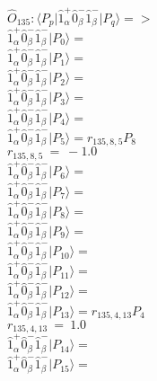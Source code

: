 \documentclass[14pt]{article}
\begin{document}
    $\hat{O}_{135}:  \langle{P_p}\vert \hat{1}_{\alpha}^{+}\hat{0}_{\beta}^{-}\hat{1}_{\beta}^{-} \vert{P_q}\rangle => $ \\ 
    $ \hat{1}_{\alpha}^{+}\hat{0}_{\beta}^{-}\hat{1}_{\beta}^{-} \vert{P_{0}}\rangle =  $ \\ 
    $ \hat{1}_{\alpha}^{+}\hat{0}_{\beta}^{-}\hat{1}_{\beta}^{-} \vert{P_{1}}\rangle =  $ \\ 
    $ \hat{1}_{\alpha}^{+}\hat{0}_{\beta}^{-}\hat{1}_{\beta}^{-} \vert{P_{2}}\rangle =  $ \\ 
    $ \hat{1}_{\alpha}^{+}\hat{0}_{\beta}^{-}\hat{1}_{\beta}^{-} \vert{P_{3}}\rangle =  $ \\ 
    $ \hat{1}_{\alpha}^{+}\hat{0}_{\beta}^{-}\hat{1}_{\beta}^{-} \vert{P_{4}}\rangle =  $ \\ 
    $ \hat{1}_{\alpha}^{+}\hat{0}_{\beta}^{-}\hat{1}_{\beta}^{-} \vert{P_{5}}\rangle = {r}_{135,8,5}P_{8} $ \\ 
    ${r}_{135,8,5}\ =\ -1.0 $ \\ 
    $ \hat{1}_{\alpha}^{+}\hat{0}_{\beta}^{-}\hat{1}_{\beta}^{-} \vert{P_{6}}\rangle =  $ \\ 
    $ \hat{1}_{\alpha}^{+}\hat{0}_{\beta}^{-}\hat{1}_{\beta}^{-} \vert{P_{7}}\rangle =  $ \\ 
    $ \hat{1}_{\alpha}^{+}\hat{0}_{\beta}^{-}\hat{1}_{\beta}^{-} \vert{P_{8}}\rangle =  $ \\ 
    $ \hat{1}_{\alpha}^{+}\hat{0}_{\beta}^{-}\hat{1}_{\beta}^{-} \vert{P_{9}}\rangle =  $ \\ 
    $ \hat{1}_{\alpha}^{+}\hat{0}_{\beta}^{-}\hat{1}_{\beta}^{-} \vert{P_{10}}\rangle =  $ \\ 
    $ \hat{1}_{\alpha}^{+}\hat{0}_{\beta}^{-}\hat{1}_{\beta}^{-} \vert{P_{11}}\rangle =  $ \\ 
    $ \hat{1}_{\alpha}^{+}\hat{0}_{\beta}^{-}\hat{1}_{\beta}^{-} \vert{P_{12}}\rangle =  $ \\ 
    $ \hat{1}_{\alpha}^{+}\hat{0}_{\beta}^{-}\hat{1}_{\beta}^{-} \vert{P_{13}}\rangle = {r}_{135,4,13}P_{4} $ \\ 
    ${r}_{135,4,13}\ =\ 1.0 $ \\ 
    $ \hat{1}_{\alpha}^{+}\hat{0}_{\beta}^{-}\hat{1}_{\beta}^{-} \vert{P_{14}}\rangle =  $ \\ 
    $ \hat{1}_{\alpha}^{+}\hat{0}_{\beta}^{-}\hat{1}_{\beta}^{-} \vert{P_{15}}\rangle =  $ \\ 
    
\end{document}
